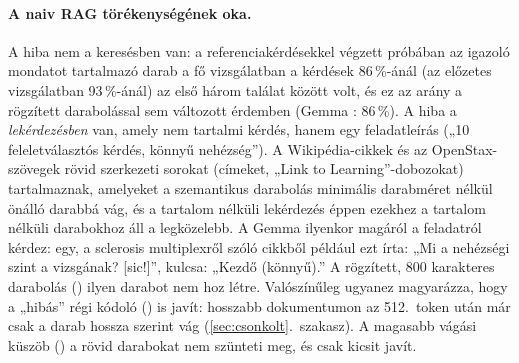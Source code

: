 \paragraph{A naiv RAG törékenységének oka.} A hiba nem a keresésben van: a referenciakérdésekkel végzett
próbában az igazoló mondatot tartalmazó darab a fő vizsgálatban a kérdések 86\,\%-ánál (az előzetes vizsgálatban
93\,\%-ánál) az első három találat között volt, és ez az arány a rögzített darabolással sem változott érdemben
(Gemma : 86\,\%). A hiba a \emph{lekérdezésben} van, amely nem tartalmi kérdés, hanem egy feladatleírás
(„10 feleletválasztós kérdés, könnyű nehézség”). A Wikipédia-cikkek és az OpenStax-szövegek rövid szerkezeti
sorokat (címeket, „Link to Learning”-dobozokat) tartalmaznak, amelyeket a szemantikus darabolás minimális
darabméret nélkül önálló darabbá vág, és a tartalom nélküli lekérdezés éppen ezekhez a tartalom nélküli
darabokhoz áll a legközelebb. A Gemma ilyenkor magáról a feladatról kérdez: egy, a sclerosis multiplexről szóló
cikkből például ezt írta: „Mi a nehézségi szint a vizsgának? [sic!]”, kulcsa: „Kezdő (könnyű).” A rögzített, 800
karakteres darabolás () ilyen darabot nem hoz létre. Valószínűleg ugyanez magyarázza, hogy a „hibás”
régi kódoló () is javít: hosszabb dokumentumon az 512.~token után már csak a darab hossza szerint vág
(\ref{sec:csonkolt}.~szakasz). A magasabb vágási küszöb () a rövid darabokat nem szünteti meg, és csak
kicsit javít.

